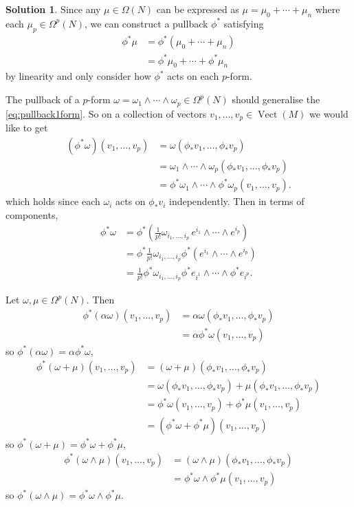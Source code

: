 \documentclass[11pt, a4paper]{report}
\theoremstyle{definition}
\newtheorem{solution}{Solution}[part]
\newenvironment{sol}{\begin{solution}}{\end{solution}\pagebreak[3]}
\DeclareMathOperator{\Vect}{Vect}
\begin{document}
\begin{sol}

Since any $\mu \in \Omega(N)$ can be expressed as $\mu = \mu_0 + \cdots + \mu_n$ where each $\mu_p \in \Omega^p(N)$, we can construct a pullback $\phi^*$ satisfying
\begin{align*}
    \phi^* \mu &= \phi^* (\mu_0 + \cdots + \mu_n) \\
               &= \phi^* \mu_0 + \cdots + \phi^* \mu_n
\end{align*}
by linearity and only consider how $\phi^*$ acts on each $p$-form.

The pullback of a $p$-form $\omega = \omega_1 \wedge \cdots \wedge \omega_p \in \Omega^p(N)$ should generalise the \ref{eq:pullback1form}.  %
So on a collection of vectors $v_1, \ldots, v_p \in \Vect(M)$ we would like to get
\begin{align*}
    (\phi^* \omega)(v_1, \ldots, v_p) &= \omega(\phi_* v_1, \ldots, \phi_* v_p) \\
        &=\omega_1 \wedge \cdots \wedge \omega_p (\phi_* v_1, \ldots, \phi_* v_p) \\
        &= \phi^* \omega_1 \wedge \cdots \wedge \phi^* \omega_p (v_1, \ldots, v_p).
\end{align*}
which holds since each $\omega_i$ acts on $\phi_* v_i$ independently. Then in terms of components,
\begin{align*}
    \phi^* \omega &= \phi^* \left( \tfrac{1}{p!} \omega_{i_1,\ldots,i_p}\, e^{i_1} \wedge \cdots \wedge e^{i_p} \right) \\
        &= \phi^* \tfrac{1}{p!} \omega_{i_1,\ldots,i_p} \phi^* (e^{i_1} \wedge \cdots \wedge e^{i_p}) \\
        &= \tfrac{1}{p!} \phi^* \omega_{i_1,\ldots,i_p} \phi^* e_{i^1} \wedge \cdots \wedge \phi^* e_{i^p}.
\end{align*}

Let $\omega, \mu \in \Omega^p(N)$. Then
\begin{align*}
    \phi^* (\alpha \omega) (v_1, \ldots, v_p) &= \alpha \omega (\phi_* v_1, \ldots, \phi_* v_p) \\
        &= \alpha \phi^* \omega (v_1, \ldots, v_p)
\end{align*}
so $\phi^* (\alpha \omega) = \alpha \phi^* \omega$,
\begin{align*}
    \phi^*(\omega + \mu) (v_1, \ldots, v_p) &= (\omega + \mu) (\phi_* v_1, \ldots, \phi_* v_p) \\
        &= \omega(\phi_* v_1, \ldots, \phi_* v_p) + \mu(\phi_* v_1, \ldots, \phi_* v_p) \\
        &= \phi^* \omega (v_1, \ldots, v_p) + \phi^* \mu (v_1, \ldots, v_p) \\
        &= (\phi^* \omega + \phi^* \mu) (v_1, \ldots, v_p)
\end{align*}
so $\phi^*(\omega + \mu) = \phi^* \omega + \phi^* \mu$,
\begin{align*}
    \phi^*(\omega \wedge \mu) (v_1, \ldots, v_p) &= (\omega \wedge \mu) (\phi_* v_1, \ldots, \phi_* v_p) \\
        &= \phi^*\omega \wedge \phi^*\mu (v_1, \ldots, v_p)
\end{align*}
so $\phi^* (\omega \wedge \mu) = \phi^* \omega \wedge \phi^* \mu$.


\end{sol}
\end{document}
